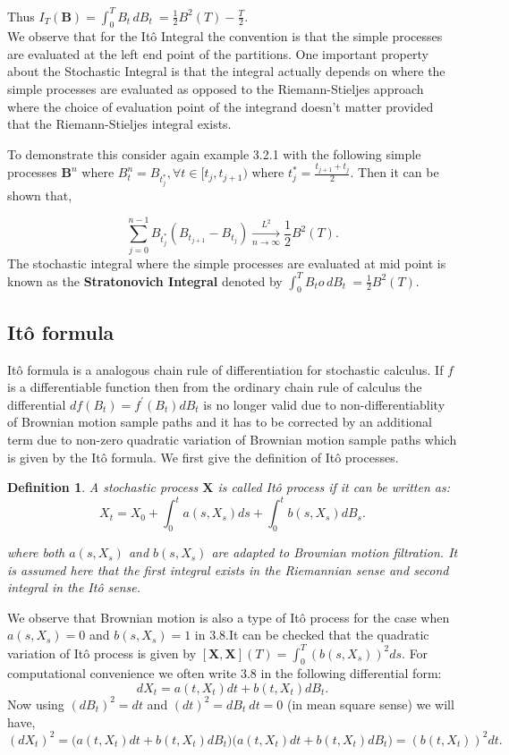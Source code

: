 \documentclass[12pt]{report}
\newtheorem{definition}{Definition}[section]
\begin{document}
Thus $I_{T}(\mathbf{B})= \int_{0}^{T} B_t \,dB_t\ = \frac{1}{2}B^{2}(T) - \frac{T}{2}$.\\
We observe that for the Itô Integral the convention is that the simple processes are evaluated at the left end point of the partitions. One important property about the Stochastic Integral is that the integral actually depends on where the simple processes are evaluated as opposed to the Riemann-Stieljes approach where the choice of evaluation point of the integrand doesn't matter provided that the Riemann-Stieljes integral exists.\par 
To demonstrate this consider again example 3.2.1 with the following simple processes $\mathbf{B}^{n} $ where
$B_{t}^{n} = B_{t_{j}^{*}} ,\forall t\in [t_{j},{t_{j+1}})$ where $t_{j}^{*}= \frac{t_{j+1}+t_{j}}{2}$. Then it can be shown that,\par
$$\sum_{j=0}^{n-1}B_{t_{j}^{*}}(B_{t_{j+1}}-B_{t_{j}}) \xrightarrow[n \longrightarrow \infty]{L^{2}} \frac{1}{2}B^{2}(T).$$
The stochastic integral where the simple processes are evaluated at mid point is known as the \textbf{Stratonovich Integral} denoted by $\int_{0}^{T} B_to\,dB_t\ = \frac{1}{2}B^{2}(T)$.

\subsection{Itô formula}
Itô formula is a analogous chain rule of differentiation for stochastic calculus. If $f$ is a differentiable function then from the ordinary chain rule of calculus the differential $df(B_t)=f^{'}(B_t)dB_t$ is no longer valid due to non-differentiablity of Brownian motion sample paths and it has to be corrected by an additional term due to non-zero quadratic variation of Brownian motion sample paths which is given by the Itô formula. We first give the definition of Itô processes.
\begin{definition}
A stochastic process $\mathbf{X}$ is called Itô process if it can be written as:
 \begin{equation}
     X_t = X_0 +\int_{0}^{t}a(s,X_s)ds + \int_{0}^{t}b(s,X_s)dB_s.
 \end{equation}

where both $a(s,X_s)$ and $b(s,X_s)$ are adapted to Brownian motion filtration. It is assumed here that the first integral exists in the Riemannian sense and second integral in the Itô sense.
\end{definition}\par
We observe that Brownian motion is also a type of Itô process for the case when $a(s,X_s)=0$ and $b(s,X_s) = 1$ in 3.8.It can be checked that the quadratic variation of Itô process is given by $[\mathbf{X},\mathbf{X}](T)=\int_{0}^{T}(b(s,X_s))^{2}ds$. For computational convenience we often write 3.8 in the following differential form:
\begin{equation}
    dX_t = a(t,X_t)dt + b(t,X_t)dB_t.
\end{equation}
Now using $(dB_t)^2 = dt$ and $(dt)^2 = dB_t~dt = 0$ (in mean square sense) we will have,
$$(dX_t)^2 = \Big(a(t,X_t) dt + b(t,X_t) dB_t\Big)\Big(a(t,X_t) dt + b(t,X_t) dB_t\Big) = (b(t,X_t))^{2} dt.$$
\end{document}
